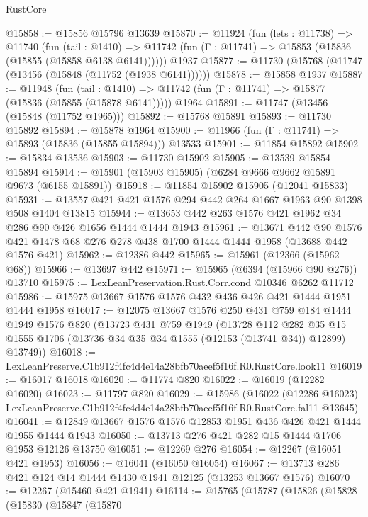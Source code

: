 \begin{lexlean}{RustCore}
\begin{coremodule}
@15858 := @15856 @15796 @13639
@15870 := @11924
    (fun (lets : @11738) =>
    @11740
      (fun (tail : @1410) =>
      @11742 (fun (Γ : @11741) => @15853 (@15836 (@15855 (@15858 @6138 @6141))))))
    @1937
@15877 := @11730 (@15768 (@11747 (@13456 (@15848 (@11752 (@1938 @6141))))))
@15878 := @15858 @1937
@15887 := @11948
    (fun (tail : @1410) => @11742 (fun (Γ : @11741) => @15877 (@15836 (@15855 (@15878 @6141)))))
    @1964
@15891 := @11747 (@13456 (@15848 (@11752 @1965)))
@15892 := @15768 @15891
@15893 := @11730 @15892
@15894 := @15878 @1964
@15900 := @11966 (fun (Γ : @11741) => @15893 (@15836 (@15855 @15894))) @13533
@15901 := @11854 @15892
@15902 := @15834 @13536
@15903 := @11730 @15902
@15905 := @13539 @15854 @15894
@15914 := @15901 (@15903 @15905) (@6284 @9666 @9662 @15891 @9673 (@6155 @15891))
@15918 := @11854 @15902 @15905 (@12041 @15833)
@15931 := @13557 @421 @421 @1576 @294 @442 @264 @1667 @1963 @90 @1398 @508 @1404 @13815
@15944 := @13653 @442 @263 @1576 @421 @1962 @34 @286 @90 @426 @1656 @1444 @1444 @1943
@15961 := @13671
    @442
    @90
    @1576
    @421
    @1478
    @68
    @276
    @278
    @438
    @1700
    @1444
    @1444
    @1958
    (@13688 @442 @1576 @421)
@15962 := @12386 @442
@15965 := @15961 (@12366 (@15962 @68))
@15966 := @13697 @442
@15971 := @15965 (@6394 (@15966 @90 @276)) @13710
@15975 := LexLeanPreservation.Rust.Corr.cond @10346 @6262 @11712
@15986 := @15975 @13667 @1576 @1576 @432 @436 @426 @421 @1444 @1951 @1444 @1958
@16017 := @12075
    @13667
    @1576
    @250
    @431
    @759
    @184
    @1444
    @1949
    @1576
    @820
    (@13723
      @431
      @759
      @1949
      (@13728
        @112
        @282
        @35
        @15
        @1555
        @1706
        (@13736 @34 @35 @34 @1555 (@12153 (@13741 @34)) @12899)
        @13749))
@16018 := LexLeanPreserve.C1b912f4fc4d4e14a28bfb70aeef5f16f.R0.RustCore.look11
@16019 := @16017 @16018
@16020 := @11774 @820
@16022 := @16019 (@12282 @16020)
@16023 := @11797 @820
@16029 := @15986
    (@16022
      (@12286 @16023)
      LexLeanPreserve.C1b912f4fc4d4e14a28bfb70aeef5f16f.R0.RustCore.fal11
      @13645)
@16041 := @12849 @13667 @1576 @1576 @12853 @1951 @436 @426 @421 @1444 @1955 @1444 @1943
@16050 := @13713 @276 @421 @282 @15 @1444 @1706 @1953 @12126 @13750
@16051 := @12269 @276
@16054 := @12267 (@16051 @421 @1953)
@16056 := @16041 (@16050 @16054)
@16067 := @13713 @286 @421 @124 @14 @1444 @1430 @1941 @12125 (@13253 @13667 @1576)
@16070 := @12267 (@15460 @421 @1941)
@16114 := @15765
    (@15787
      (@15826
        (@15828
          (@15830
            (@15847
              (@15870

\end{coremodule}
\end{lexlean}
